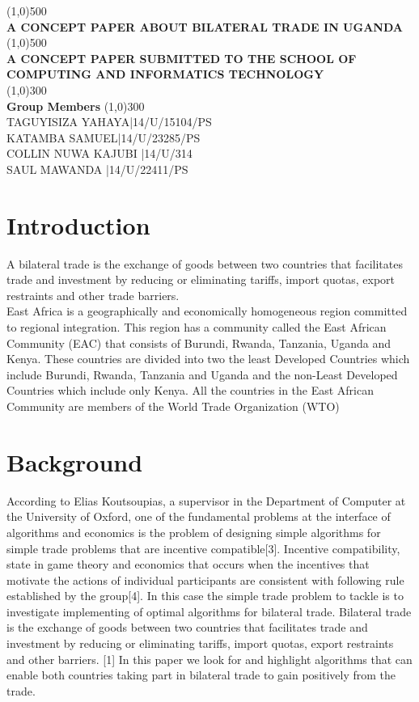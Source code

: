 \documentclass[12pt,a4paper]{article}
\begin{document}
\begin{titlepage}
    \begin{center}
\line(1,0){500}\\
\huge{\bfseries A CONCEPT PAPER ABOUT BILATERAL TRADE IN UGANDA\\}
\line(1,0){500}\\
[0.25in]
\huge{\bfseries A CONCEPT PAPER SUBMITTED TO THE SCHOOL OF COMPUTING AND INFORMATICS TECHNOLOGY}\\
[1.5in]
\line(1,0){300}\\
\huge{\bfseries Group Members}
\line(1,0){300}\\
TAGUYISIZA YAHAYA|14/U/15104/PS\\
KATAMBA SAMUEL|14/U/23285/PS\\
COLLIN NUWA KAJUBI |14/U/314\\
SAUL MAWANDA |14/U/22411/PS\\
\end{center}
\end{titlepage}
\author{GROUP 122}
\section{Introduction}
A bilateral trade is the exchange of goods between two countries that facilitates trade and investment by reducing or eliminating tariffs, import quotas, export restraints and other trade barriers.\\
East Africa is a geographically and economically homogeneous region committed to regional integration. This region has a community called the East African Community (EAC) that consists of Burundi, Rwanda, Tanzania, Uganda and Kenya. These countries are divided into two the least Developed Countries which include Burundi, Rwanda, Tanzania and Uganda and the non-Least Developed Countries which include only Kenya. All the countries in the East African Community are members of the World Trade Organization (WTO)
\section{Background}
According to Elias Koutsoupias, a supervisor in the Department of Computer at the University of Oxford, one of the fundamental problems at the interface of algorithms and economics is the problem of designing simple algorithms for simple trade problems that are incentive compatible[3]. Incentive compatibility, state in game theory and economics that occurs when the incentives that motivate the actions of individual participants are consistent with following rule established by the group[4]. In this case the simple trade problem to tackle is to investigate implementing of optimal algorithms for bilateral trade. Bilateral trade is the exchange of goods between two countries that facilitates trade and investment by reducing or eliminating tariffs, import quotas, export restraints and other barriers. [1] In this paper we look for and highlight algorithms that can enable both countries taking part in bilateral trade to gain positively from the trade.
\end{document}

